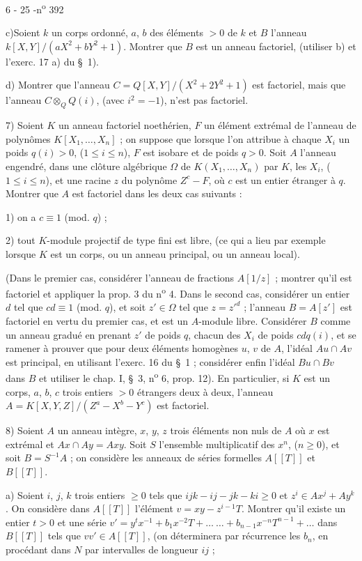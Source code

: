 \begin{center}6 - 25 -\hfill n\textsuperscript{o} 392\end{center}

c)Soient $k$ un corps ordonné, $a$, $b$ des éléments $>0$ de $k$ et $B$ l'anneau $k[X,Y]/(aX^2+bY^2+1)$. Montrer que $B$ est un anneau factoriel, (utiliser b) et l'exerc. 17 a) du \S\ 1).

d) Montrer que l'anneau $C=Q[X,Y]/(X^2+2Y^2+1)$ est factoriel, mais que l'anneau $C\otimes_Q Q(i)$, (avec $i^2=-1$), n'est pas factoriel.

7) Soient $K$ un anneau factoriel noethérien, $F$ un élément extrémal de l'anneau de polynômes $K[X_1,\ldots,X_n]$ ; on suppose que lorsque l'on attribue à chaque $X_i$ un poids $q(i)>0$, ($1\leq i\leq n$), $F$ est isobare et de poids $q>0$. Soit $A$ l'anneau engendré, dans une clôture algébrique $\Omega$ de $K(X_1,\ldots,X_n)$ par $K$, les $X_i$, ($1\leq i\leq n$), et une racine $z$ du polynôme $Z^c-F$, où $c$ est un entier étranger à $q$. Montrer que $A$ est factoriel dans les deux cas suivants :

1) on a $c\equiv 1$ (mod. $q$) ;

2) tout $K$-module projectif de type fini est libre, (ce qui a lieu par exemple lorsque $K$ est un corps, ou un anneau principal, ou un anneau local).

(Dans le premier cas, considérer l'anneau de fractions $A[1/z]$ ; montrer qu'il est factoriel et appliquer la prop. 3 du n\textsuperscript{o} 4. Dans le second cas, considérer un entier $d$ tel que $cd\equiv 1$ (mod. $q$), et soit $z'\in\Omega$ tel que $z=z'^{d}$ ; l'anneau $B=A[z']$ est factoriel en vertu du premier cas, et est un $A$-module libre. Considérer $B$ comme un anneau gradué en prenant $z'$ de poids $q$, chacun des $X_i$ de poids $cdq(i)$, et se ramener à prouver que pour deux éléments homogènes $u$, $v$ de $A$, l'idéal $Au\cap Av$ est principal, en utilisant l'exerc. 16 du \S\ 1 ; considérer enfin l'idéal $Bu\cap Bv$ dans $B$ et utiliser le chap. I, \S\ 3, n\textsuperscript{o} 6, prop. 12). En particulier, si $K$ est un corps, $a$, $b$, $c$ trois entiers $>0$ étrangers deux à deux, l'anneau $A=K[X,Y,Z]/(Z^a-X^b-Y^c)$ est factoriel.

8) Soient $A$ un anneau intègre, $x$, $y$, $z$ trois éléments non nuls de $A$ où $x$ est extrémal et $Ax\cap Ay=Axy$. Soit $S$ l'ensemble multiplicatif des $x^n$, ($n\geq 0$), et soit $B=S^{-1}A$ ; on considère les anneaux de séries formelles $A[[T]]$ et $B[[T]]$.

a) Soient $i$, $j$, $k$ trois entiers $\geq 0$ tels que $ijk-ij-jk-ki\geq 0$ et $z^i\in Ax^j+Ay^k$. On considère dans $A[[T]]$ l'élément $v=xy-z^{i-1}T$. Montrer qu'il existe un entier $t>0$ et une série $v'=y^tx^{-1}+b_1x^{-2}T+\ldots\ \ldots+b_{n-1}x^{-n}T^{n-1}+\ldots$ dans $B[[T]]$ tels que $vv'\in A[[T]]$, (on déterminera par récurrence les $b_n$, en procédant dans $N$ par intervalles de longueur $ij$ ;


